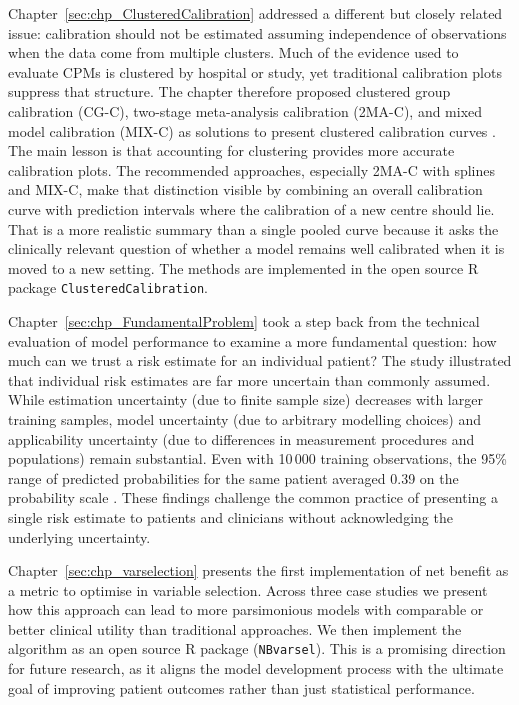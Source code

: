 Chapter~\ref{sec:chp_ClusteredCalibration} addressed a different but closely related issue: calibration should not be estimated assuming independence of observations  when the data come from multiple clusters. Much of the evidence used to evaluate \glspl{CPM} is clustered by hospital or study, yet traditional calibration plots suppress that structure. The chapter therefore proposed clustered group calibration (CG-C), two-stage meta-analysis calibration (2MA-C), and mixed model calibration (MIX-C) as solutions to present clustered calibration curves \cite{barrenadaClusteredFlexibleCalibration2026}. The main lesson is that accounting for clustering provides more accurate calibration plots. The recommended approaches, especially 2MA-C with splines and MIX-C, make that distinction visible by combining an overall calibration curve with prediction intervals where the calibration of a new centre should lie. That is a more realistic summary than a single pooled curve because it asks the clinically relevant question of whether a model remains well calibrated when it is moved to a new setting. The methods are implemented in the open source R package \texttt{ClusteredCalibration}.

Chapter~\ref{sec:chp_FundamentalProblem} took a step back from the technical evaluation of model performance to examine a more fundamental question: how much can we trust a risk estimate for an individual patient? The study illustrated that individual risk estimates are far more uncertain than commonly assumed. While estimation uncertainty (due to finite sample size) decreases with larger training samples, model uncertainty (due to arbitrary modelling choices) and applicability uncertainty (due to differences in measurement procedures and populations) remain substantial. Even with 10\,000 training observations, the 95\% range of predicted probabilities for the same patient averaged 0.39 on the probability scale \cite{barrenadaFundamentalProblemRisk2025}. These findings challenge the common practice of presenting a single risk estimate to patients and clinicians without acknowledging the underlying uncertainty.

Chapter~\ref{sec:chp_varselection} presents the first implementation of net benefit as a metric to optimise in variable selection. Across three case studies we present how this approach can lead to more parsimonious models with comparable or better clinical utility than traditional approaches. We then implement the algorithm as an open source R package (\texttt{NBvarsel}). This is a promising direction for future research, as it aligns the model development process with the ultimate goal of improving patient outcomes rather than just statistical performance.



